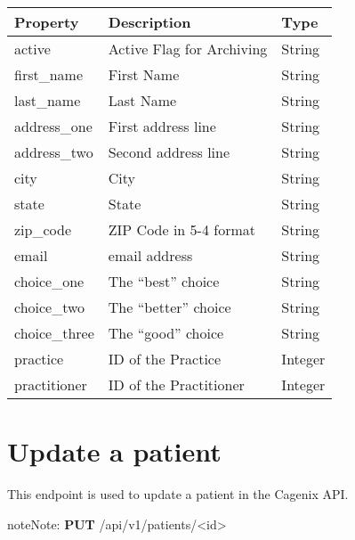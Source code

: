 \documentclass[letterpaper,10pt,english]{sphinxmanual}
\begin{document}
\begin{tabulary}{\linewidth}{|L|L|L|}
\hline
\textsf{\relax 
Property
} & \textsf{\relax 
Description
} & \textsf{\relax 
Type
}\\
\hline
active
 & 
Active Flag for Archiving
 & 
String
\\

first\_name
 & 
First Name
 & 
String
\\

last\_name
 & 
Last Name
 & 
String
\\

address\_one
 & 
First address line
 & 
String
\\

address\_two
 & 
Second address line
 & 
String
\\

city
 & 
City
 & 
String
\\

state
 & 
State
 & 
String
\\

zip\_code
 & 
ZIP Code in 5-4 format
 & 
String
\\

email
 & 
email address
 & 
String
\\

choice\_one
 & 
The ``best'' choice
 & 
String
\\

choice\_two
 & 
The ``better'' choice
 & 
String
\\

choice\_three
 & 
The ``good'' choice
 & 
String
\\

practice
 & 
ID of the Practice
 & 
Integer
\\

practitioner
 & 
ID of the Practitioner
 & 
Integer
\\
\hline\end{tabulary}



\section{Update a patient}
\label{dev-api-patients:update-a-patient}
This endpoint is used to update a patient in the Cagenix API.

\begin{notice}{note}{Note:}
\textbf{PUT} /api/v1/patients/\textless{}id\textgreater{}
\end{notice}
\end{document}
